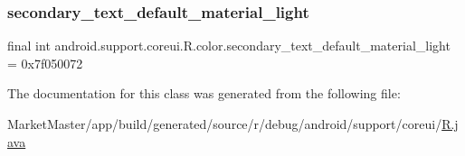 \subsubsection{\texorpdfstring{secondary\+\_\+text\+\_\+default\+\_\+material\+\_\+light}{secondary\_text\_default\_material\_light}}
{\footnotesize\ttfamily final int android.\+support.\+coreui.\+R.\+color.\+secondary\+\_\+text\+\_\+default\+\_\+material\+\_\+light = 0x7f050072\hspace{0.3cm}{\ttfamily [static]}}



The documentation for this class was generated from the following file\+:\begin{DoxyCompactItemize}
\item 
Market\+Master/app/build/generated/source/r/debug/android/support/coreui/\mbox{\hyperlink{debug_2android_2support_2coreui_2R_8java}{R.\+java}}\end{DoxyCompactItemize}
